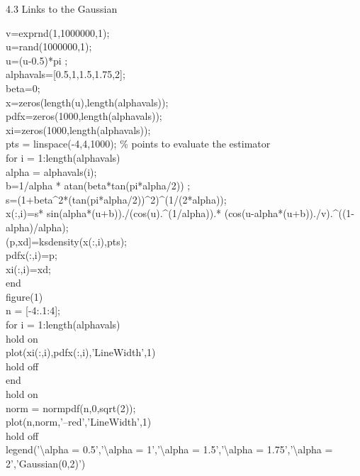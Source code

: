 \documentclass[twoside,twocolumn]{article}
\begin{document}
\begin{large}
4.3 Links to the Gaussian
\end{large}
\newline
\begin{itshape}
v=exprnd(1,1000000,1);\\
u=rand(1000000,1);\\
u=(u-0.5)*pi ;\\
alphavals=[0.5,1,1.5,1.75,2];\\
beta=0;\\
x=zeros(length(u),length(alphavals));\\
pdfx=zeros(1000,length(alphavals));\\
xi=zeros(1000,length(alphavals));\\
pts = linspace(-4,4,1000); \% points to evaluate the estimator\\
for i = 1:length(alphavals)\\
alpha = alphavals(i);\\
b=1/alpha * atan(beta*tan(pi*alpha/2)) ;\\
s=(1+beta\^{}2*(tan(pi*alpha/2))\^{}2)\^{}(1/(2*alpha));\\
x(:,i)=s* sin(alpha*(u+b))./(cos(u).\^{}(1/alpha)).* (cos(u-alpha*(u+b))./v).\^{}((1-alpha)/alpha); \\
(p,xd]=ksdensity(x(:,i),pts);\\
pdfx(:,i)=p;\\
xi(:,i)=xd;\\
end\\
figure(1)\\
n = [-4:.1:4];\\
for i = 1:length(alphavals)\\
   hold on\\
   plot(xi(:,i),pdfx(:,i),'LineWidth',1)\\
   hold off\\
end\\
hold on\\
norm = normpdf(n,0,sqrt(2));\\
plot(n,norm,'--red','LineWidth',1)\\
hold off\\
legend('\textbackslash alpha = 0.5','\textbackslash alpha = 1','\textbackslash alpha = 1.5','\textbackslash alpha = 1.75','\textbackslash alpha = 2','Gaussian(0,2)')\\
\end{itshape}


\end{document}
